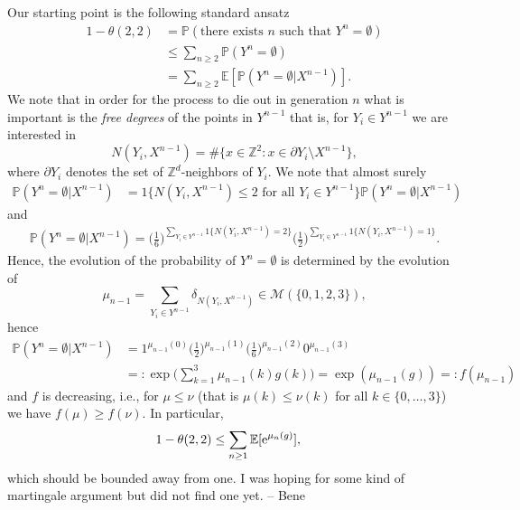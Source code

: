 \documentclass{article}
\theoremstyle{definition}
\newcommand{\1}{\mathbbm{1}}
\newcommand{\0}{\mathbf{o}}
\begin{document}
Our starting point is the following standard ansatz
\begin{align*}
1-\theta(2,2)&= \mathbb P(\text{there exists $n$ such that $Y^n=\emptyset$})\\
&\le  \sum_{n\ge 2}\mathbb P(Y^n=\emptyset)\\
&=  \sum_{n\ge 2}\mathbb E[\mathbb P(Y^n=\emptyset|X^{n-1})]. 
\end{align*}
We note that in order for the process to die out in generation $n$ what is important is the {\em free degrees} of the points in $Y^{n-1}$ that is, for $Y_i\in Y^{n-1}$ we are interested in 
$$
N(Y_i, X^{n-1})=\#\{x\in \mathbb Z^2\colon x\in \partial Y_i\setminus X^{n-1}\},
$$
where $\partial Y_i$ denotes the set of $\mathbb Z^d$-neighbors of $Y_i$. We note that almost surely
\begin{align*}
\mathbb P(Y^n=\emptyset|X^{n-1})&=1\{N(Y_i, X^{n-1})\le 2\text{ for all }Y_i\in Y^{n-1}\}\mathbb P(Y^n=\emptyset|X^{n-1})
\end{align*}
and 
\begin{align*}
\mathbb P(Y^n=\emptyset|X^{n-1})= \Big(\frac{1}{6}\Big)^{\sum_{Y_i\in Y^{n-1}}1\{N(Y_i,X^{n-1})=2\}} \Big(\frac{1}{2}\Big)^{\sum_{Y_i\in Y^{n-1}}1\{N(Y_i,X^{n-1})=1\}}.
\end{align*}
Hence, the evolution of the probability of $Y^n=\emptyset$ is determined by the evolution of 
$$
\mu_{n-1}=\sum_{Y_i\in Y^{n-1}}\delta_{N(Y_i,X^{n-1})}\in \mathcal M(\{0,1,2,3\}),
$$
hence 
\begin{align*}
\mathbb P(Y^n=\emptyset|X^{n-1})&=1^{\mu_{n-1}(0)}\Big(\frac{1}{2}\Big)^{\mu_{n-1}(1)}\Big(\frac{1}{6}\Big)^{\mu_{n-1}(2)}0^{\mu_{n-1}(3)}\\
&=:\exp\Big(\sum_{k=1}^3\mu_{n-1}(k)g(k)\Big)=\exp(\mu_{n-1}(g)) =:f(\mu_{n-1})
\end{align*}
and $f$ is decreasing, i.e., for $\mu\le \nu$ (that is $\mu(k)\le \nu(k)$ for all $k\in \{0,\dots, 3\}$) we have $f(\mu)\ge f(\nu)$. In particular, 
\begin{align*}
1-\theta(2,2)&\le  \sum_{n\ge 1}\mathbb E[{\rm e}^{\mu_n(g)}],
\end{align*}
which should be bounded away from one. 
\color{blue} I was hoping for some kind of martingale argument but did not find one yet. -- Bene\color{black}
\end{document}
